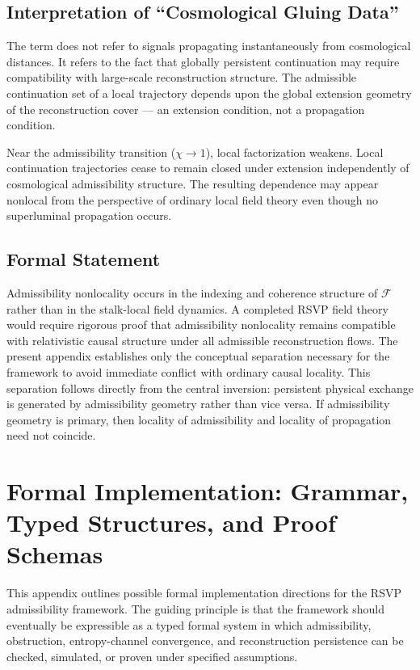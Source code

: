 \documentclass[11pt, a4paper]{article}
\theoremstyle{plain}
\theoremstyle{definition}
\theoremstyle{remark}
\newcommand{\sheaf}{\mathcal{F}}
\begin{document}
\subsection{Interpretation of ``Cosmological Gluing Data''}

The term does not refer to signals propagating instantaneously from cosmological
distances. It refers to the fact that globally persistent continuation may require
compatibility with large-scale reconstruction structure. The admissible continuation
set of a local trajectory depends upon the global extension geometry of the
reconstruction cover --- an extension condition, not a propagation condition.

Near the admissibility transition ($\chi \to 1$), local factorization weakens. Local
continuation trajectories cease to remain closed under extension independently of
cosmological admissibility structure. The resulting dependence may appear nonlocal
from the perspective of ordinary local field theory even though no superluminal
propagation occurs.

\subsection{Formal Statement}

Admissibility nonlocality occurs in the indexing and coherence structure of $\sheaf$
rather than in the stalk-local field dynamics. A completed RSVP field theory would
require rigorous proof that admissibility nonlocality remains compatible with
relativistic causal structure under all admissible reconstruction flows. The present
appendix establishes only the conceptual separation necessary for the framework to
avoid immediate conflict with ordinary causal locality. This separation follows
directly from the central inversion: persistent physical exchange is generated by
admissibility geometry rather than vice versa. If admissibility geometry is primary,
then locality of admissibility and locality of propagation need not coincide.

\section{Formal Implementation: Grammar, Typed Structures, and Proof Schemas}
\label{app:implementation}

This appendix outlines possible formal implementation directions for the RSVP
admissibility framework. The guiding principle is that the framework should
eventually be expressible as a typed formal system in which admissibility,
obstruction, entropy-channel convergence, and reconstruction persistence can be
checked, simulated, or proven under specified assumptions.
\end{document}
